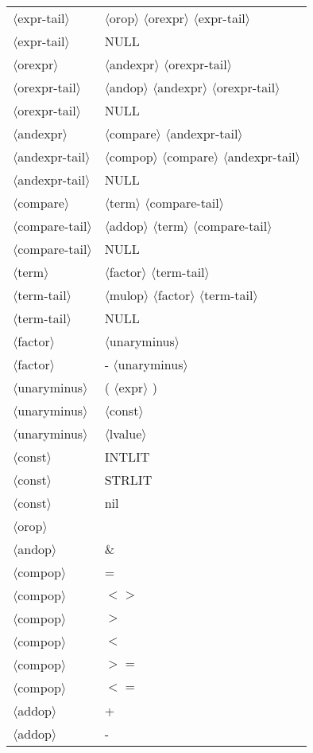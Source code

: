 \documentclass[11pt, fleqn]{article}
\newcommand{\atag}[1]{$\langle$#1$\rangle$}
\begin{document}
\begin{longtable}{l|l}
\atag{expr-tail}					&	\atag{orop} \atag{orexpr} \atag{expr-tail}	\\
\atag{expr-tail}					&	NULL		\\
\atag{orexpr} 					&	\atag{andexpr} \atag{orexpr-tail}		\\
\atag{orexpr-tail}				&	\atag{andop} \atag{andexpr} \atag{orexpr-tail}	\\
\atag{orexpr-tail}				&	NULL	\\
\atag{andexpr} 					&	\atag{compare} \atag{andexpr-tail}		\\
\atag{andexpr-tail}				&	\atag{compop} \atag{compare} \atag{andexpr-tail}	\\
\atag{andexpr-tail}				&	NULL	\\
\atag{compare} 					&	\atag{term} \atag{compare-tail}		\\
\atag{compare-tail}				&	\atag{addop} \atag{term} \atag{compare-tail}	\\
\atag{compare-tail}				&	NULL	\\
\atag{term} 						&	\atag{factor} \atag{term-tail}		\\
\atag{term-tail}					&	\atag{mulop} \atag{factor} \atag{term-tail}	\\
\atag{term-tail}					&	NULL	\\
\atag{factor}					&	\atag{unaryminus}		\\
\atag{factor}					&	- \atag{unaryminus}		\\
\atag{unaryminus}				&	( \atag{expr} )		\\
\atag{unaryminus}				&	\atag{const}		\\
\atag{unaryminus}				&	\atag{lvalue}		\\
\atag{const}						&	INTLIT		\\
\atag{const}						&	STRLIT		\\
\atag{const}						&	nil		\\
\atag{orop} 						&	\textbar		\\
\atag{andop}						&	\&		\\
\atag{compop}					&	=		\\
\atag{compop}					&	$<>$		\\
\atag{compop}					&	$>$		\\
\atag{compop}					&	$<$		\\
\atag{compop}					&	$>=$		\\
\atag{compop}					&	$<=$		\\
\atag{addop}						&	+		\\
\atag{addop}						&	-		\\

\end{longtable}
\end{document}
